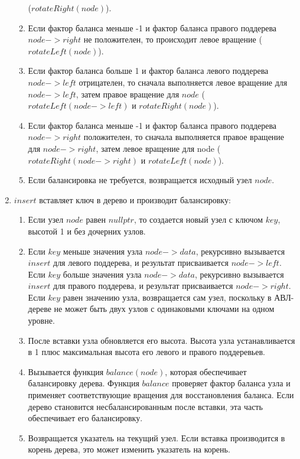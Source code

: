 \documentclass[12pt, a4paper]{article}
\begin{document}
\begin{enumerate}
\begin{enumerate}
		($rotateRight(node)$).
		\item Если фактор баланса меньше -1 и фактор баланса правого 
		поддерева $node->right$ не положителен, то происходит левое 
		вращение ($rotateLeft(node)$).
		\item Если фактор баланса больше 1 и фактор баланса левого 
		поддерева $node->left$ отрицателен, то сначала выполняется левое 
		вращение для $node->left$, затем правое вращение для $node$
		($rotateLeft(node->left)$ и $rotateRight(node)$).
		\item Если фактор баланса меньше -1 и фактор баланса правого 
		поддерева $node->right$ положителен, то сначала выполняется правое 
		вращение для $node->right$, затем левое вращение для node 
		($rotateRight(node->right)$ и $rotateLeft(node)$).
		\item Если балансировка не требуется, возвращается исходный узел 
		$node$.
	\end{enumerate}
	\item $insert$ вставляет ключ в дерево и производит балансировку:
	\begin{enumerate}
		\item Если узел $node$ равен $nullptr$, то создается новый узел с 
		ключом $key$, высотой 1 и без дочерних узлов.
		\item Если $key$ меньше значения узла $node->data$, рекурсивно 
		вызывается $insert$ для левого поддерева, и результат присваивается 
		$node->left$.\\
		Если $key$ больше значения узла $node->data$, рекурсивно вызывается 
		$insert$ для правого поддерева, и результат присваивается $node-
		>right$.\\
		Если $key$ равен значению узла, возвращается сам узел, поскольку
		в АВЛ-дереве не может быть двух узлов с одинаковыми ключами на 
		одном уровне.
		\item После вставки узла обновляется его высота. Высота узла 
		устанавливается в 1 плюс максимальная высота его левого и правого 
		поддеревьев.
		\item Вызывается функция $balance(node)$, которая обеспечивает 
		балансировку дерева. Функция $balance$ проверяет фактор баланса 
		узла и применяет соответствующие вращения для восстановления 
		баланса. Если дерево становится несбалансированным после вставки, 
		эта часть обеспечивает его балансировку.
		\item Возвращается указатель на текущий узел. Если вставка 
		производится в корень дерева, это может изменить указатель на 
		корень.
	\end{enumerate}

\end{enumerate}
\end{document}
